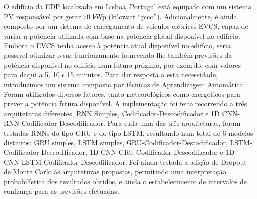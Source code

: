 \noindent O edifício da \ac{EDP} localizado em Lisboa, Portugal está equipado com um sistema \ac{PV} responsável por gerar 70 kWp (kilowatt “pico”). Adicionalmente, é ainda composto por um sistema de carregamento de veículos elétricos \ac{EVCS}, capaz de variar a potência utilizada com base na potência global disponível no edifício. Embora o \ac{EVCS} tenha acesso à potência atual disponível no edifício, seria possível otimizar o sue funcionamento fornecendo-lhe também previsões da potência disponível no edifício num futuro próximo, por exemplo, com valores para daqui a 5, 10 e 15 minutos. Para dar resposta a esta necessidade, introduzimos um sistema composto por técnicas de Aprendizagem Automática. Foram utilizados diversos fatores, tanto meteorológicos como energéticos para prever a potência futura disponível. A implementação foi feita recorrendo a três arquiteturas diferentes, \ac{RNN} Simples, Codificador-Descodificador e \ac{1D CNN}-\ac{RNN}-Codificador-Descodificador. Para cada uma das três arquiteturas, foram testadas \ac{RNN}s do tipo \ac{GRU} e do tipo \ac{LSTM}, resultando num total de 6 modelos distintos: \ac{GRU} simples, \ac{LSTM} simples, \ac{GRU}-Codificador-Descodificador, \ac{LSTM}-Codificador-Descodificador, \ac{1D CNN}-\ac{GRU}-Codificador-Descodificador e \ac{1D CNN}-\ac{LSTM}-Codificador-Descodificador. Foi ainda testada a adição de Dropout de Monte Carlo às arquiteturas propostas, permitindo uma interpretação probabilística dos resultados obtidos, e ainda o estabelecimento de intervalos de confiança para as previsões efetuadas. 
